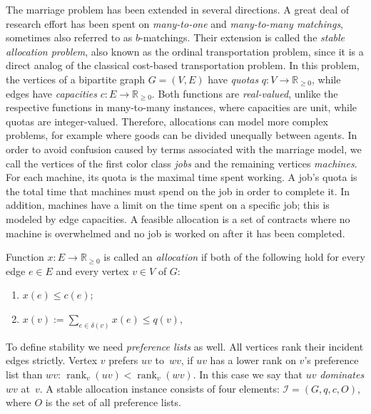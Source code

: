 \documentclass{llncs}
\DeclareMathOperator{\rank}{rank}
\begin{document}
The marriage problem has been extended in several directions. A great deal of research effort has been spent on \emph{many-to-one} and \emph{many-to-many matchings}, sometimes also referred to as $b$-matchings. Their extension is called the \emph{stable allocation problem}, also known as the ordinal transportation problem, since it is a
direct analog of the classical cost-based transportation problem. In this problem, the vertices of a bipartite graph $G=(V,E)$ have \emph{quotas} $q: V \rightarrow \mathbb{R}_{\geq 0}$, while edges have \emph{capacities} $c: E \rightarrow \mathbb{R}_{\geq 0}$. Both functions are \emph{real-valued}, unlike the respective functions in many-to-many instances, where capacities are unit, while quotas are integer-valued. Therefore, allocations can model more complex problems, for example where goods can be divided unequally between agents. In order to avoid confusion caused by terms associated with the marriage model, we call the vertices of the first color class \emph{jobs} and the remaining vertices \emph{machines}. For each machine, its quota is the maximal time spent working. A job's quota is the total time that machines must spend on the job in order to complete it. In addition, machines have a limit on the time spent on a specific job; this is modeled by edge capacities. A feasible allocation is a set of contracts where no machine is overwhelmed and no job is worked on after it has been completed.

\begin{definition} [allocation]
	Function $x: E \rightarrow \mathbb{R}_{\geq 0}$ is called an \emph{allocation} if both of the following hold for every edge $e \in E$ and every vertex $v \in V$ of $G$:
	\begin{enumerate}
		\item $x(e) \leq c(e)$;
		\item $x(v) := \sum_{e \in \delta(v)} x(e) \leq q(v),$ 
	\end{enumerate}
\end{definition}

To define stability we need \emph{preference lists} as well. All vertices rank their incident edges strictly. Vertex $v$ prefers $uv$ to~$wv$, if $uv$ has a lower rank on $v$'s preference list than $wv$: $\rank_v(uv) < \rank_v(wv)$. In this case we say that $uv$ \emph{dominates} $wv$ at~$v$. A stable allocation instance consists of four elements: $\mathcal{I} = (G, q, c, O)$, where $O$ is the set of all preference lists.
\end{document}
